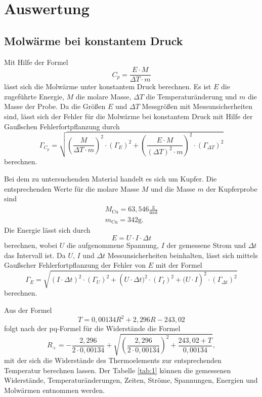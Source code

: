 \section{Auswertung}
\subsection{Molwärme bei konstantem Druck}
Mit Hilfe der Formel
\begin{equation}
  C_p = \frac{E \cdot M}{\Delta T \cdot m}
\end{equation}
lässt sich die Molwärme unter konstantem Druck berechnen.
Es ist $E$ die zugeführte Energie, $M$ die molare Masse, $\Delta T$ die Temperaturänderung und $m$ die Masse der Probe.
Da die Größen $E$ und $\Delta{T}$ Messgrößen mit Messunsicherheiten sind,
lässt sich der Fehler für die Molwärme bei konstantem Druck mit Hilfe der Gaußschen Fehlerfortpflanzung durch
\begin{equation}
  \Gamma_{C_p} = \sqrt{ \left(\frac{M}{\Delta{T}\cdot m }\right)^2 \cdot (\Gamma_E)^2 + \left(\frac{E\cdot{M}}{(\Delta{T})^2\cdot{m}}\right)^2\cdot(\Gamma_{\Delta{T}})^2 }
\end{equation}
berechnen.

Bei dem zu untersuchenden Material handelt es sich um Kupfer.
Die entsprechenden Werte für die molare Masse $M$ \cite{cu} und die Masse $m$ der Kupferprobe sind
\begin{gather*}
  M_{\text{Cu}} = 63,546\frac{\text{g}}{\text{mol}} \\%
  m_{\text{Cu}} = 342\si{\gram}.
\end{gather*}
Die Energie lässt sich durch
\begin{equation}
  E = U\cdot I\cdot \Delta t
\end{equation}
berechnen, wobei $U$ die aufgenommene Spannung, $I$ der gemessene Strom und $\Delta t$ das Intervall ist.
Da $U$, $I$ und $\Delta{t}$ Messunsicherheiten beinhalten,
lässt sich mittels Gaußscher Fehlerfortpflanzung der Fehler von $E$ mit der Formel
\begin{equation}
  \Gamma_E = \sqrt{ \left(I\cdot\Delta{t}\right)^2\cdot(\Gamma_U)^2 + \left(U\cdot\Delta{t})^2\cdot(\Gamma_I)^2 + (U\cdot{I}\right)^2\cdot(\Gamma_{\Delta{t}})^2 }
\end{equation}
berechnen.

Aus der Formel
\begin{equation}
  T = 0,00134R^2 + 2,296R - 243,02
\end{equation}
folgt nach der pq-Formel für die Widerstände die Formel
\begin{equation}
  R_+ = -\frac{2,296}{2\cdot0,00134} + \sqrt{ \left(\frac{2,296}{2\cdot0,00134}\right)^2 + \frac{243,02 + T}{0,00134} },
  \end{equation}
mit der sich die Widerstände des Thermoelements zur entsprechenden Temperatur berechnen lassen.
Der Tabelle \ref{tab:1} können die gemessenen Widerstände, Temperaturänderungen, Zeiten, Ströme, Spannungen, Energien und Molwärmen entnommen werden.

